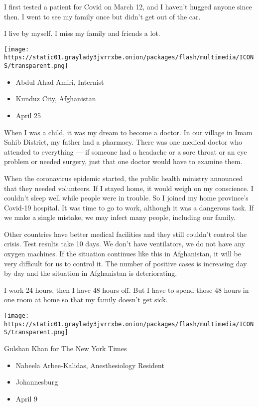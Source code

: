 I first tested a patient for Covid on March 12, and I haven't hugged
anyone since then. I went to see my family once but didn't get out of
the car.

I live by myself. I miss my family and friends a lot.

\texttt{[image: https://static01.graylady3jvrrxbe.onion/packages/flash/multimedia/ICONS/transparent.png]}

\begin{itemize}
\tightlist
\item
  Abdul Ahad Amiri, Internist
\item
  Kunduz City, Afghanistan
\item
  April 25
\end{itemize}

When I was a child, it was my dream to become a doctor. In our village
in Imam Sahib District, my father had a pharmacy. There was one medical
doctor who attended to everything --- if someone had a headache or a
sore throat or an eye problem or needed surgery, just that one doctor
would have to examine them.

When the coronavirus epidemic started, the public health ministry
announced that they needed volunteers. If I stayed home, it would weigh
on my conscience. I couldn't sleep well while people were in trouble. So
I joined my home province's Covid-19 hospital. It was time to go to
work, although it was a dangerous task. If we make a single mistake, we
may infect many people, including our family.

Other countries have better medical facilities and they still couldn't
control the crisis. Test results take 10 days. We don't have
ventilators, we do not have any oxygen machines. If the situation
continues like this in Afghanistan, it will be very difficult for us to
control it. The number of positive cases is increasing day by day and
the situation in Afghanistan is deteriorating.

I work 24 hours, then I have 48 hours off. But I have to spend those 48
hours in one room at home so that my family doesn't get sick.

\texttt{[image: https://static01.graylady3jvrrxbe.onion/packages/flash/multimedia/ICONS/transparent.png]}

Gulshan Khan for The New York Times

\begin{itemize}
\tightlist
\item
  Nabeela Arbee-Kalidas, Anesthesiology Resident
\item
  Johannesburg
\item
  April 9
\end{itemize}

